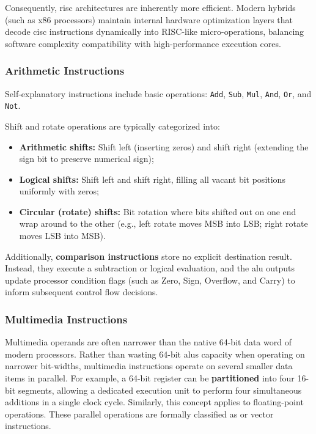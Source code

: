 \noindent Consequently, \gls{risc} architectures are inherently more efficient. Modern hybrids (such as x86 processors) maintain internal hardware optimization layers that decode \gls{cisc} instructions dynamically into RISC-like micro-operations, balancing software complexity compatibility with high-performance execution cores.

\subsubsection{Arithmetic Instructions}
Self-explanatory instructions include basic operations: \texttt{Add}, \texttt{Sub}, \texttt{Mul}, \texttt{And}, \texttt{Or}, and \texttt{Not}. 

\noindent Shift and rotate operations are typically categorized into:
\begin{itemize}
    \item \textbf{Arithmetic shifts:} Shift left (inserting zeros) and shift right (extending the sign bit to preserve numerical sign);
    \item \textbf{Logical shifts:} Shift left and shift right, filling all vacant bit positions uniformly with zeros;
    \item \textbf{Circular (rotate) shifts:} Bit rotation where bits shifted out on one end wrap around to the other (e.g., left rotate moves MSB into LSB; right rotate moves LSB into MSB).
\end{itemize}

\noindent Additionally, \textbf{comparison instructions} store no explicit destination result. Instead, they execute a subtraction or logical evaluation, and the \gls{alu} outputs update processor condition flags (such as Zero, Sign, Overflow, and Carry) to inform subsequent control flow decisions.

\subsubsection{Multimedia Instructions}
Multimedia operands are often narrower than the native 64-bit data word of modern processors. Rather than wasting 64-bit \glspl{alu} capacity when operating on narrower bit-widths, multimedia instructions operate on several smaller data items in parallel. For example, a 64-bit register can be \textbf{partitioned} into four 16-bit segments, allowing a dedicated execution unit to perform four simultaneous additions in a single clock cycle. Similarly, this concept applies to floating-point operations. These parallel operations are formally classified as  or vector instructions.

